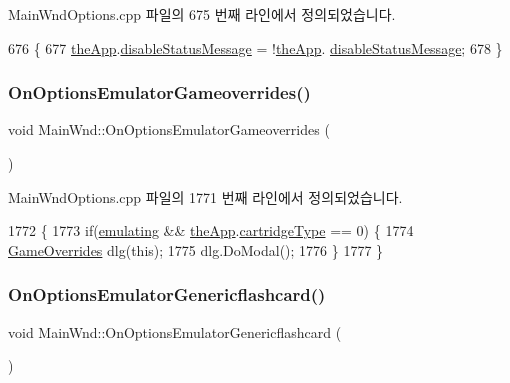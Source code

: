 Main\+Wnd\+Options.\+cpp 파일의 675 번째 라인에서 정의되었습니다.


\begin{DoxyCode}
676 \{
677   \mbox{\hyperlink{_v_b_a_8cpp_a8095a9d06b37a7efe3723f3218ad8fb3}{theApp}}.\mbox{\hyperlink{class_v_b_a_a7bfea5ab60b19d26053b22ce070e2248}{disableStatusMessage}} = !\mbox{\hyperlink{_v_b_a_8cpp_a8095a9d06b37a7efe3723f3218ad8fb3}{theApp}}.
      \mbox{\hyperlink{class_v_b_a_a7bfea5ab60b19d26053b22ce070e2248}{disableStatusMessage}};
678 \}
\end{DoxyCode}
\mbox{\label{class_main_wnd_a219c1f71e6f873fc5f48d19fe6ce36ac}} 
\subsubsection{\texorpdfstring{On\+Options\+Emulator\+Gameoverrides()}{OnOptionsEmulatorGameoverrides()}}
{\footnotesize\ttfamily void Main\+Wnd\+::\+On\+Options\+Emulator\+Gameoverrides (\begin{DoxyParamCaption}{ }\end{DoxyParamCaption})\hspace{0.3cm}{\ttfamily [protected]}}



Main\+Wnd\+Options.\+cpp 파일의 1771 번째 라인에서 정의되었습니다.


\begin{DoxyCode}
1772 \{
1773   \textcolor{keywordflow}{if}(\mbox{\hyperlink{_main_wnd_options_8cpp_af9cc36078b1b311753963297ae7f2a74}{emulating}} && \mbox{\hyperlink{_v_b_a_8cpp_a8095a9d06b37a7efe3723f3218ad8fb3}{theApp}}.\mbox{\hyperlink{class_v_b_a_af300759fcbc7eeb00ce73f956fc5ddb7}{cartridgeType}} == 0) \{
1774     \mbox{\hyperlink{class_game_overrides}{GameOverrides}} dlg(\textcolor{keyword}{this});
1775     dlg.DoModal();
1776   \}
1777 \}
\end{DoxyCode}
\mbox{\label{class_main_wnd_a39017815a0e680f2e6db60c49bae967e}} 
\subsubsection{\texorpdfstring{On\+Options\+Emulator\+Genericflashcard()}{OnOptionsEmulatorGenericflashcard()}}
{\footnotesize\ttfamily void Main\+Wnd\+::\+On\+Options\+Emulator\+Genericflashcard (\begin{DoxyParamCaption}{ }\end{DoxyParamCaption})\hspace{0.3cm}{\ttfamily [protected]}}



